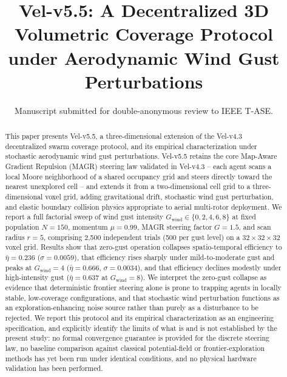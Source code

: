 \documentclass[10pt,journal]{IEEEtran}
\begin{document}
\title{Vel-v5.5: A Decentralized 3D Volumetric Coverage Protocol\\ under Aerodynamic Wind Gust Perturbations}

\author{Manuscript submitted for double-anonymous review to IEEE T-ASE.}


\maketitle

\begin{abstract}
This paper presents Vel-v5.5, a three-dimensional extension of the Vel-v4.3
decentralized swarm coverage protocol, and its empirical characterization
under stochastic aerodynamic wind gust perturbations. Vel-v5.5 retains the
core Map-Aware Gradient Repulsion (MAGR) steering law validated in Vel-v4.3
-- each agent scans a local Moore neighborhood of a shared occupancy grid and
steers directly toward the nearest unexplored cell -- and extends it from a
two-dimensional cell grid to a three-dimensional voxel grid, adding
gravitational drift, stochastic wind gust perturbation, and elastic boundary
collision physics appropriate to aerial multi-rotor deployment. We report a
full factorial sweep of wind gust intensity $G_{\text{wind}} \in \{0, 2, 4,
6, 8\}$ at fixed population $N=150$, momentum $\mu=0.99$, MAGR steering
factor $G=1.5$, and scan radius $r=5$, comprising 2{,}500 independent trials
(500 per gust level) on a $32\times32\times32$ voxel grid. Results show that
zero-gust operation collapses spatio-temporal efficiency to
$\bar{\eta}=0.236$ ($\sigma=0.0059$), that efficiency rises sharply under
mild-to-moderate gust and peaks at $G_{\text{wind}}=4$
($\bar{\eta}=0.666$, $\sigma=0.0034$), and that efficiency declines modestly
under high-intensity gust ($\bar{\eta}=0.637$ at $G_{\text{wind}}=8$). We
interpret the zero-gust collapse as evidence that deterministic frontier
steering alone is prone to trapping agents in locally stable, low-coverage
configurations, and that stochastic wind perturbation functions as an
exploration-enhancing noise source rather than purely as a disturbance to be
rejected. We report this protocol and its empirical characterization as an
engineering specification, and explicitly identify the limits of what is
and is not established by the present study: no formal convergence
guarantee is provided for the discrete steering law, no baseline comparison
against classical potential-field or frontier-exploration methods has yet
been run under identical conditions, and no physical hardware validation
has been performed.
\end{abstract}
\end{document}
